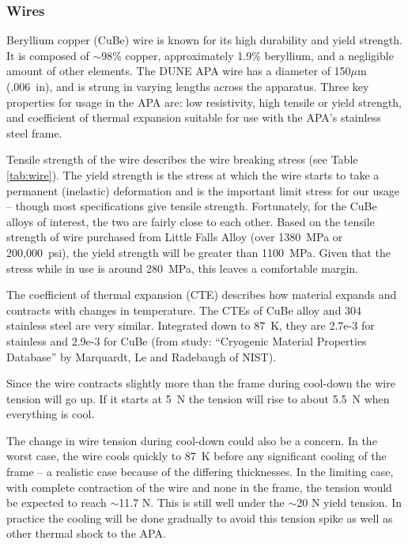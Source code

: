 \subsubsection{Wires}

Beryllium copper (CuBe) wire is known for its high durability and yield strength. It is composed of $\sim$98$\%$ copper, approximately 1.9$\%$ beryllium, and a negligible amount of other elements. The DUNE APA wire has a diameter of 150$\mu$m (.006~in), and is strung in varying lengths across the apparatus. Three key properties for usage in the APA are: low resistivity, high tensile or yield strength, and coefficient of thermal expansion suitable for use with the APA's stainless steel frame.

Tensile strength of the wire describes the wire breaking stress (see Table \ref{tab:wire}).  The yield strength is the stress at which the wire starts to take a permanent (inelastic) deformation and is the important limit stress for our usage -- though most specifications give tensile strength.  Fortunately, for the CuBe alloys of interest, the two are fairly close to each other.  Based on the tensile strength of wire purchased from Little Falls Alloy (over 1380~MPa or 200,000~psi), the yield strength will be greater than 1100~MPa.  Given that the stress while in use is around 280~MPa, this leaves a comfortable margin.

The coefficient of thermal expansion (CTE) describes how material expands and contracts with changes in temperature.  The CTEs of CuBe alloy and 304 stainless steel are very similar.  Integrated down to 87~K, they are 2.7e-3 for stainless and 2.9e-3 for CuBe  (from study: ``Cryogenic Material Properties Database'' by Marquardt, Le and Radebaugh of NIST).

Since the wire contracts slightly more than the frame during cool-down the wire tension will go up.  If it starts at 5~N the tension will rise to about 5.5~N when everything is cool.  

The change in wire tension during cool-down could also be a concern.  In the worst case, the wire
 cools quickly to 87~K before any significant cooling of the frame  -- a realistic case because of the differing thicknesses.  In the limiting case, with complete contraction of the wire and none in the frame, the tension would be expected to reach $\sim$11.7 N.  This is still well under the $\sim$20 N yield tension.
In practice the cooling will be done gradually to avoid this tension spike as well as other thermal shock to the APA.

